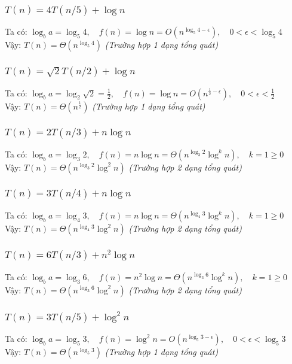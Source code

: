 \subsubsection{$T(n) = 4T(n/5) + \log n$}
Ta có: $\log_b a = \log_5 4 , \quad f(n) = \log n = O(n^{\log_5 4-\epsilon}),\quad 0 < \epsilon < \log_5 4 $ \\
Vậy: $T(n) = \Theta(n^{\log_5 4})$ \textit{(Trường hợp 1 dạng tổng quát)}
\subsubsection{$T(n)=\sqrt{2}T(n/2)+\log n$}
Ta có: $\log_b a = \log_2 \sqrt{2} = \frac{1}{2} , \quad f(n) = \log n = O(n^{\frac{1}{2}-\epsilon}),\quad 0 < \epsilon < \frac{1}{2} $ \\
Vậy: $T(n) = \Theta(n^{\frac{1}{2}})$ \textit{(Trường hợp 1 dạng tổng quát)}
\subsubsection{$T(n) = 2T(n/3) +n\log n$}
Ta có: $\log_b a = \log_3 2 , \quad f(n) = n\log n = \Theta\left(n^{\log_3 2} \log^k n \right), \quad k = 1 \geq 0 $ \\
Vậy: $T(n) = \Theta\left(n^{\log_3 2} \log^2 n \right)$ \textit{(Trường hợp 2 dạng tổng quát)}
\subsubsection{$T(n) = 3T(n/4) +n\log n$}
Ta có: $\log_b a = \log_4 3 , \quad f(n) = n\log n = \Theta\left(n^{\log_4 3} \log^k n \right), \quad k = 1 \geq 0 $ \\
Vậy: $T(n) = \Theta\left(n^{\log_4 3} \log^2 n \right)$ \textit{(Trường hợp 2 dạng tổng quát)}
\subsubsection{$T(n) = 6T(n/3) +n^2\log n$}
Ta có: $\log_b a = \log_3 6 , \quad f(n) = n^2\log n = \Theta\left(n^{\log_3 6} \log^k n \right), \quad k = 1 \geq 0 $ \\
Vậy: $T(n) = \Theta\left(n^{\log_3 6} \log^2 n \right)$ \textit{(Trường hợp 2 dạng tổng quát)}
\subsubsection{$T(n) = 3T(n/5) +\log^2 n$}
Ta có: $\log_b a = \log_5 3 , \quad f(n) = \log^2 n = O(n^{\log_5 3-\epsilon}),\quad 0 < \epsilon < \log_5 3 $ \\
Vậy: $T(n) = \Theta(n^{\log_5 3})$ \textit{(Trường hợp 1 dạng tổng quát)}
